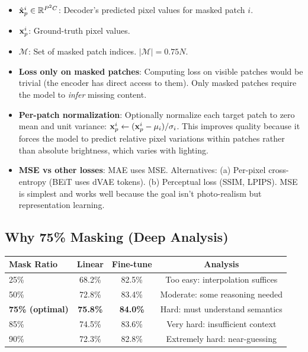 \begin{keybox}
\begin{itemize}
\item $\hat{\mathbf{x}}_p^i \in \mathbb{R}^{P^2 C}$: Decoder's predicted pixel values for masked patch $i$.
\item $\mathbf{x}_p^i$: Ground-truth pixel values.
\item $\mathcal{M}$: Set of masked patch indices. $|\mathcal{M}| = 0.75N$.
\item \textbf{Loss only on masked patches}: Computing loss on visible patches would be trivial (the encoder has direct access to them). Only masked patches require the model to \emph{infer} missing content.
\item \textbf{Per-patch normalization}: Optionally normalize each target patch to zero mean and unit variance: $\mathbf{x}_p^i \leftarrow (\mathbf{x}_p^i - \mu_i)/\sigma_i$. This improves quality because it forces the model to predict relative pixel variations within patches rather than absolute brightness, which varies with lighting.
\item \textbf{MSE vs other losses}: MAE uses MSE. Alternatives: (a) Per-pixel cross-entropy (BEiT uses dVAE tokens). (b) Perceptual loss (SSIM, LPIPS). MSE is simplest and works well because the goal isn't photo-realism but representation learning.
\end{itemize}
\end{keybox}

\subsection{Why 75\% Masking (Deep Analysis)}

\begin{center}\small
\begin{tabular}{lccc}\toprule
\textbf{Mask Ratio} & \textbf{Linear} & \textbf{Fine-tune} & \textbf{Analysis} \\\midrule
25\% & 68.2\% & 82.5\% & Too easy: interpolation suffices \\
50\% & 72.8\% & 83.4\% & Moderate: some reasoning needed \\
\textbf{75\% (optimal)} & \textbf{75.8\%} & \textbf{84.0\%} & Hard: must understand semantics \\
85\% & 74.5\% & 83.6\% & Very hard: insufficient context \\
90\% & 72.3\% & 82.8\% & Extremely hard: near-guessing \\
\bottomrule
\end{tabular}
\end{center}

